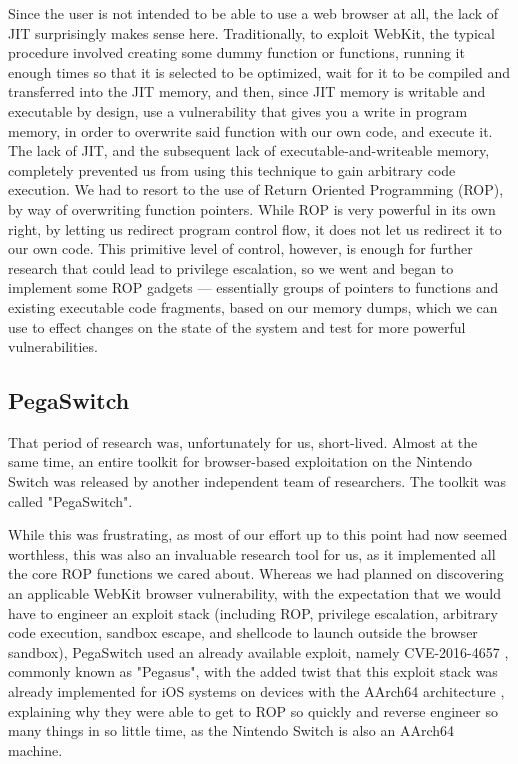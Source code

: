 \documentclass[journal]{IEEEtran}
\begin{document}
Since the user is not intended to be able to use a web browser at all, the lack of JIT
surprisingly makes sense here. Traditionally, to exploit WebKit, the typical procedure
involved creating some dummy function or functions, running it enough times so that it is
selected to be optimized, wait for it to be compiled and transferred into the JIT memory,
and then, since JIT memory is writable and executable by design, use a vulnerability that
gives you a write in program memory, in order to overwrite said function with our own code,
and execute it. The lack of JIT, and the subsequent lack of executable-and-writeable memory,
completely prevented us from using this technique to gain arbitrary code execution. We had
to resort to the use of Return Oriented Programming (ROP), by way of overwriting function
pointers. While ROP is very powerful in its own right, by letting us redirect program control
flow, it does not let us redirect it to our own code. This primitive level of control,
however, is enough for further research that could lead to privilege escalation, so we went
and began to implement some ROP gadgets --- essentially groups of pointers to functions and
existing executable code fragments, based on our memory dumps, which we can use to effect
changes on the state of the system and test for more powerful vulnerabilities.

\subsection{PegaSwitch}
That period of research was, unfortunately for us, short-lived.
Almost at the same time, an entire toolkit for browser-based exploitation on the Nintendo
Switch was released by another independent team of researchers. The toolkit was
called "PegaSwitch". \cite{pega}

While this was frustrating, as most of our effort up to this point had now seemed worthless,
this was also an invaluable research tool for us, as it implemented all the core ROP functions
we cared about. Whereas we had planned on discovering an applicable WebKit browser
vulnerability, with the expectation that we would have to engineer an exploit stack (including
ROP, privilege escalation, arbitrary code execution, sandbox escape, and shellcode to launch
outside the browser sandbox), PegaSwitch used an already available exploit, namely CVE-2016-4657
\cite{jbme_cve}, commonly known as "Pegasus", with the added twist that this exploit stack was
already implemented for iOS systems on devices with the AArch64 architecture \cite{jbme},
explaining why they were able to get to ROP so quickly and reverse engineer so many things in so
little time, as the Nintendo Switch is also an AArch64 machine.
\end{document}
